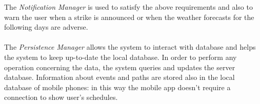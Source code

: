 The \textit{Notification Manager} is used to satisfy the above requirements and also to warn the user when a strike is announced or when the weather forecasts for the following days are adverse.\\\\
The \textit{Persistence Manager} allows the system to interact with database and helps the system to keep up-to-date the local database. In order to perform any operation concerning the data, the system queries and updates the server database. Information about events and paths are stored also in the local database of mobile phones: in this way the mobile app doesn't require a connection to show user's schedules. 